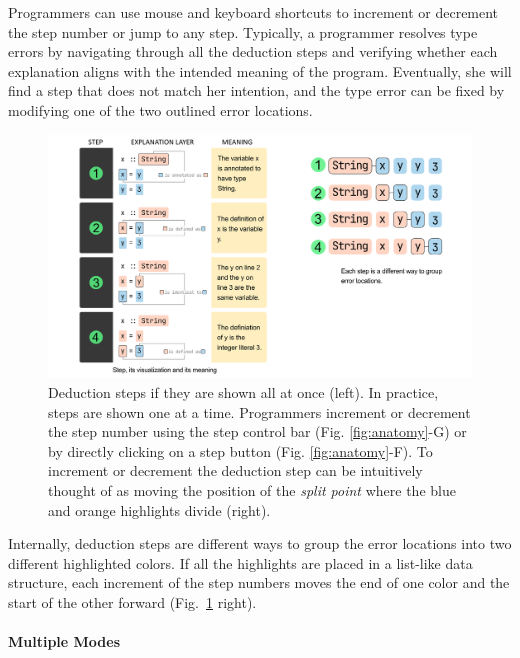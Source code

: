 Programmers can use mouse and keyboard shortcuts to increment or decrement the step number or jump to any step. Typically, a programmer resolves  type errors by navigating through all the deduction steps and verifying whether each explanation aligns with the intended meaning of the program. Eventually, she will find a step that does not match her intention, and the type error can be fixed by modifying one of the two outlined error locations.


\begin{figure}
    \centering
    \includegraphics[width=\linewidth, trim=0mm 10mm 0mm 0mm]{images/step-interface.pdf}
    \caption{
Deduction steps if they are shown all at once (left). In practice, steps are shown one at a time. Programmers increment or decrement the step number using the step control bar (Fig. \ref{fig:anatomy}-G) or by directly clicking on a step button (Fig. \ref{fig:anatomy}-F). To increment or decrement the deduction step can be intuitively thought of as moving the position of the \textit{split point} where the blue and orange highlights divide (right).
        }
    \label{fig:step-interface}
\end{figure}

Internally, deduction steps are different ways to group the error locations into two different highlighted colors. 
If all the highlights are placed in a list-like data structure, each increment of the step numbers moves the end of one color and the start of the other forward (Fig.~\ref{fig:step-interface} right).


\paragraph{Multiple Modes}

